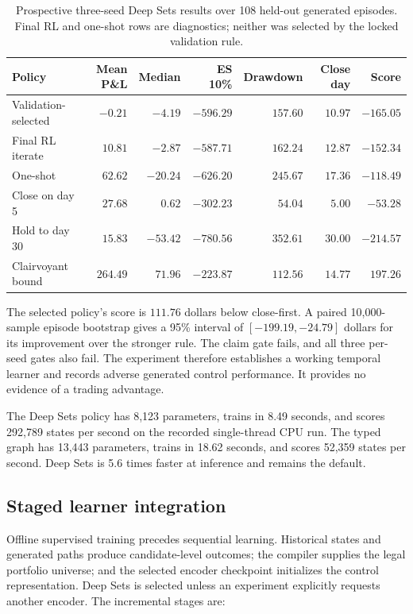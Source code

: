 \documentclass{strategynet-journal}
\begin{document}
\begin{table}[H]
\centering
\scriptsize
\begin{tabular}{lrrrrrr}
\toprule
Policy & Mean P\&L & Median & ES 10\% & Drawdown & Close day & Score \\
\midrule
Validation-selected & \(-0.21\) & \(-4.19\) & \(-596.29\) & \(157.60\) & \(10.97\) & \(-165.05\) \\
Final RL iterate & \(10.81\) & \(-2.87\) & \(-587.71\) & \(162.24\) & \(12.87\) & \(-152.34\) \\
One-shot & \(62.62\) & \(-20.24\) & \(-626.20\) & \(245.67\) & \(17.36\) & \(-118.49\) \\
Close on day 5 & \(27.68\) & \(0.62\) & \(-302.23\) & \(54.04\) & \(5.00\) & \(-53.28\) \\
Hold to day 30 & \(15.83\) & \(-53.42\) & \(-780.56\) & \(352.61\) & \(30.00\) & \(-214.57\) \\
Clairvoyant bound & \(264.49\) & \(71.96\) & \(-223.87\) & \(112.56\) & \(14.77\) & \(197.26\) \\
\bottomrule
\end{tabular}
\caption{Prospective three-seed Deep Sets results over 108 held-out generated
episodes.  Final RL and one-shot rows are diagnostics; neither was selected
by the locked validation rule.}
\label{tab:hold-close-pooled}
\end{table}

The selected policy's score is \(111.76\) dollars below close-first.  A paired
10,000-sample episode bootstrap gives a 95\% interval of
\([-199.19,-24.79]\) dollars for its improvement over the stronger rule.
The claim gate fails, and all three per-seed gates also fail.  The experiment
therefore establishes a working temporal learner and records adverse generated
control performance.  It provides no evidence of a trading advantage.

The Deep Sets policy has 8,123 parameters, trains in 8.49 seconds, and scores
292,789 states per second on the recorded single-thread CPU run.  The typed
graph has 13,443 parameters, trains in 18.62 seconds, and scores 52,359 states
per second.  Deep Sets is 5.6 times faster at inference and remains the
default.

\subsection{Staged learner integration}

Offline supervised training precedes sequential learning.  Historical states
and generated paths produce candidate-level outcomes; the compiler supplies
the legal portfolio universe; and the selected encoder checkpoint initializes
the control representation.  Deep Sets is selected unless an experiment
explicitly requests another encoder.  The incremental stages are:
\end{document}
